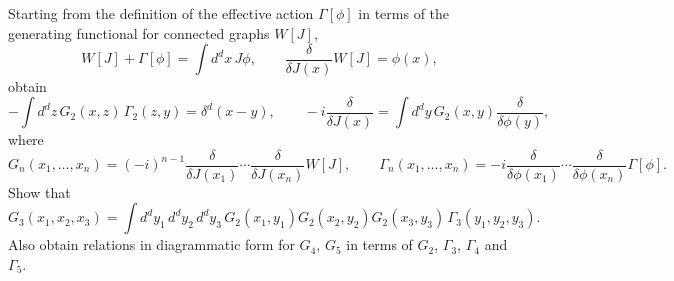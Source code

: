 Starting from the definition of the effective action $\Gamma[\phi]$ in terms of the generating functional for connected graphs $W[J]$,
\begin{equation}
    W[J] + \Gamma[\phi] = \int d^d x\, J\phi, \qquad \frac{\delta}{\delta J(x)}W[J] = \phi(x),
    \label{eq:def}
\end{equation}
obtain
\begin{equation}
    -\int d^dz\, G_2(x,z)\,\Gamma_2(z,y) = \delta^d(x-y), \qquad -i\frac{\delta}{\delta J(x)} = \int d^dy\, G_2(x,y)\frac{\delta}{\delta\phi(y)},
\end{equation}
where
\begin{equation}
    G_n(x_1,\ldots,x_n) = (-i)^{n-1}\frac{\delta}{\delta J(x_1)}\cdots\frac{\delta}{\delta J(x_n)}W[J], \qquad \Gamma_n(x_1,\ldots,x_n) = -i\frac{\delta}{\delta\phi(x_1)}\cdots\frac{\delta}{\delta\phi(x_n)}\Gamma[\phi].
\end{equation}
Show that
\begin{equation}
    G_3(x_1,x_2,x_3) = \int d^dy_1\,d^dy_2\,d^dy_3\, G_2(x_1,y_1)G_2(x_2,y_2)G_2(x_3,y_3)\,\Gamma_3(y_1,y_2,y_3).
\end{equation}
Also obtain relations in diagrammatic form for $G_4$, $G_5$ in terms of $G_2$, $\Gamma_3$, $\Gamma_4$ and $\Gamma_5$.
